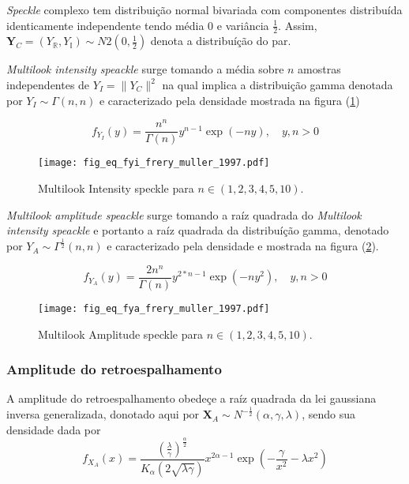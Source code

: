 {\it Speckle} complexo tem distribuição normal bivariada com componentes distribuída identicamente independente tendo média $0$ e variância $\frac{1}{2}$. Assim, $\mathbf{Y}_{C}=(Y_{\mathbb{R}}, Y_{\mathbb{I}})\sim N2(0,\frac{1}{2})$ denota a distribuíção do par.

{\it Multilook intensity speackle} surge tomando a média sobre $n$ amostras independentes de $Y_{I}=\|Y_{C}\|^2$ na qual implica a distribuição gamma denotada por $Y_{I}\sim \Gamma(n,n)$ e caracterizado pela densidade mostrada na figura (\ref{fig9})

\begin{equation}\label{eqn102}
	f_{Y_{I}}(y)=\frac{n^{n}}{\Gamma(n)}y^{n-1}\exp\left(-ny\right),\quad y,n>0 
\end{equation}

\begin{figure}[!htb]
\centering
\texttt{[image: fig\_eq\_fyi\_frery\_muller\_1997.pdf]}
	\caption{Multilook Intensity speckle  para $n\in(1,2,3,4,5,10)$.}
\label{fig9}
\end{figure}

{\it Multilook amplitude speackle} surge tomando a raíz quadrada do {\it Multilook intensity speackle} e portanto a raíz quadrada da distribuíção gamma, denotado por $Y_{A}\sim \Gamma^{\frac{1}{2}}(n,n)$ e caracterizado pela densidade e mostrada na figura  (\ref{fig10}).

\begin{equation}\label{eqn103}
	f_{Y_{A}}(y)=\frac{2n^{n}}{\Gamma(n)}y^{2*n-1}\exp\left(-ny^2\right),\quad y,n>0 
\end{equation}
\begin{figure}[!htb]
\centering
\texttt{[image: fig\_eq\_fya\_frery\_muller\_1997.pdf]}
	\caption{Multilook Amplitude speckle  para $n\in(1,2,3,4,5,10)$.}
\label{fig10}
\end{figure}
\subsubsection{Amplitude do retroespalhamento}

A amplitude do retroespalhamento obedeçe a raíz quadrada da lei gaussiana inversa generalizada, donotado aqui por $\mathbf{X}_{A}\sim N^{-\frac{1}{2}}(\alpha,\gamma,\lambda)$, sendo sua densidade dada por
\begin{equation}\label{eqn104}
	f_{X_{A}}(x)=\frac{\left(\frac{\lambda}{\gamma}\right)^{\frac{\alpha}{2}}}{K_{\alpha}(2\sqrt{\lambda\gamma})}x^{2\alpha-1}\exp\left(-\frac{\gamma}{x^2}-\lambda x^2\right) 
\end{equation}

